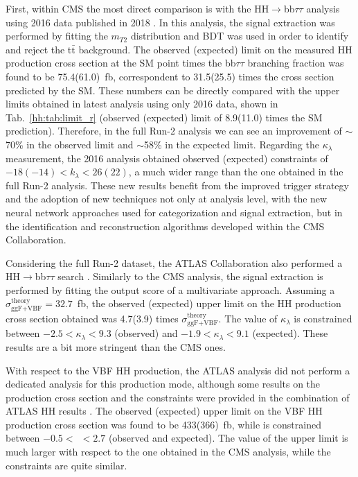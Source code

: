 \documentclass[../main.tex]{subfiles}
\begin{document}
First, within CMS the most direct comparison is with the HH$\to$bb$\tau\tau$ analysis using 2016 data published in 2018 \cite{hh:analysis:2016}. In this analysis, the signal extraction was performed by fitting the $m_{T2}$ distribution \cite{hh:analysis:mt2} and BDT was used in order to identify and reject the t$\bar{\text{t}}$ background. The observed (expected) limit on the measured HH production cross section at the SM point times the bb$\tau\tau$ branching fraction was found to be 75.4(61.0)~fb, correspondent to 31.5(25.5) times the cross section predicted by the SM. These numbers can be directly compared with the upper limits obtained in latest analysis using only 2016 data, shown in Tab.~\ref{hh:tab:limit_r} (observed (expected) limit of 8.9(11.0) times the SM prediction). Therefore, in the full Run-2 analysis we can see an improvement of $\sim$70\% in the observed limit and $\sim$58\% in the expected limit. Regarding the $\kappa_\lambda$ measurement, the 2016 analysis obtained observed (expected) constraints of $-18(-14) < k_\lambda < 26(22)$, a much wider range than the one obtained in the full Run-2 analysis. These new results benefit from the improved trigger strategy and the adoption of new techniques not only at analysis level, with the new neural network approaches used for categorization and signal extraction, but in the identification and reconstruction algorithms developed within the CMS Collaboration.

Considering the full Run-2 dataset, the ATLAS Collaboration also performed a HH$\to$bb$\tau\tau$ search \cite{hh:analysis:atlas, hh:analysis:atlas_comb}. Similarly to the CMS analysis, the signal extraction is performed by fitting the output score of a multivariate approach. Assuming a $\sigma_{\text{ggF+VBF}}^{\text{theory}}=32.7$~fb, the observed (expected) upper limit on the HH production cross section obtained was 4.7(3.9) times $\sigma_{\text{ggF+VBF}}^{\text{theory}}$. The value of $\kappa_\lambda$ is constrained between $-2.5 < \kappa_\lambda < 9.3$ (observed) and $-1.9 < \kappa_\lambda < 9.1$ (expected). These results are a bit more stringent than the CMS ones.

With respect to the VBF HH production, the ATLAS analysis did not perform a dedicated analysis for this production mode, although some results on the production cross section and the \kvv{} constraints were provided in the combination of ATLAS HH results \cite{hh:analysis:atlas_comb}. The observed (expected) upper limit on the VBF HH production cross section was found to be 433(366)~fb, while \kvv{} is constrained between $-0.5<~$\kvv{}$~<2.7$ (observed and expected). The value of the upper limit is much larger with respect to the one obtained in the CMS analysis, while the \kvv{} constraints are quite similar.
\end{document}
